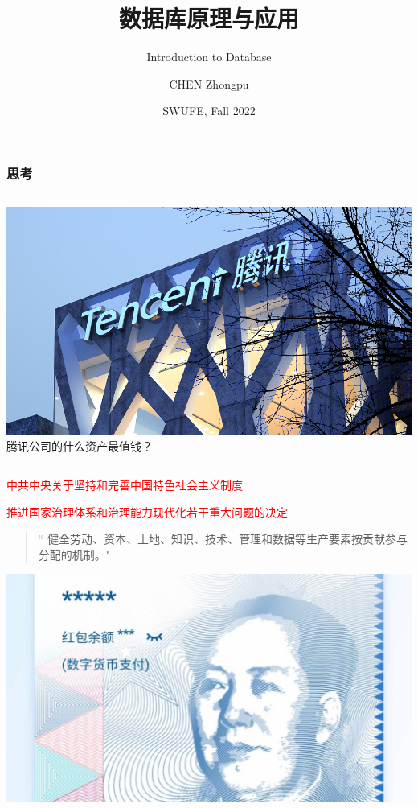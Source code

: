 \documentclass[aspectratio=169, 14pt]{beamer}
\title[Database Principles and Applications] %
{数据库原理与应用}
\subtitle{Introduction to Database}
\author[CHEN Zhongpu] %
{CHEN Zhongpu}
\institute[] %
{
  School of Computing and Artificial Intelligence \\
  \href{mailto:zpchen@swufe.edu.cn}{zpchen@swufe.edu.cn}
}
\date[] %
{SWUFE, Fall 2022}
\begin{document}
\frame{\titlepage}

\begin{frame}
\frametitle{思考}
\begin{columns}
    \includegraphics[width=.9\textwidth]{image/tencent}
    {\large {}} 腾讯公司的什么资产最值钱？
\end{columns}
\end{frame}

\begin{frame}
    \begin{center}
        \textcolor{red}{\large 中共中央关于坚持和完善中国特色社会主义制度}

        \textcolor{red}{推进国家治理体系和治理能力现代化若干重大问题的决定}
    \end{center}
    \begin{quote}
        `` 健全劳动、资本、土地、知识、技术、管理和\alert{数据}等生产要素按贡献参与分配的机制。"
    \end{quote}
\pause
    \begin{center}
        \includegraphics[width=.5\textwidth]{image/rmb}
    \end{center}

\end{frame}
\end{document}
